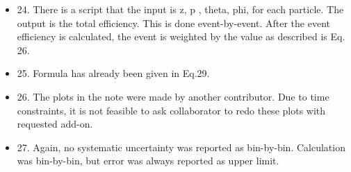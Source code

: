 \documentclass[11pt,a4paper]{article}
\begin{document}
\begin{itemize}
	\item 24. There is a script that the input is z, p , theta, phi, for each particle. The output is the total efficiency. This is done event-by-event. After the event efficiency is calculated, the event is weighted by the value as described is Eq. 26.
	\item 25. Formula has already been given in Eq.29.
	
	\item 26. The plots in the note were made by another contributor. Due to time constraints, it is not feasible to ask collaborator to redo these plots with requested add-on.
	
	\item 27. Again, no systematic uncertainty was reported as bin-by-bin. Calculation was bin-by-bin, but error was always reported as upper limit.
	
\end{itemize}
\end{document}
